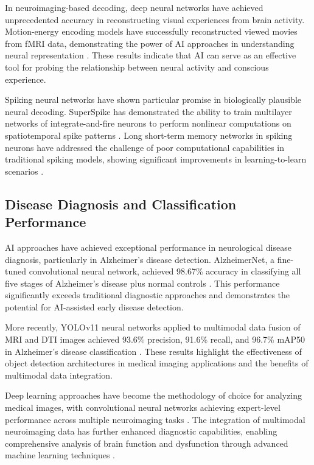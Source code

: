 \documentclass[conference]{IEEEtran}
\begin{document}
In neuroimaging-based decoding, deep neural networks have achieved unprecedented accuracy in reconstructing visual experiences from brain activity. Motion-energy encoding models have successfully reconstructed viewed movies from fMRI data, demonstrating the power of AI approaches in understanding neural representation \citep{mathisDecodingBrainNeural2024}. These results indicate that AI can serve as an effective tool for probing the relationship between neural activity and conscious experience.

Spiking neural networks have shown particular promise in biologically plausible neural decoding. SuperSpike has demonstrated the ability to train multilayer networks of integrate-and-fire neurons to perform nonlinear computations on spatiotemporal spike patterns \citep{zenkeSuperSpikeSupervisedLearning2018}. Long short-term memory networks in spiking neurons have addressed the challenge of poor computational capabilities in traditional spiking models, showing significant improvements in learning-to-learn scenarios \citep{bellecLongShorttermMemory2018}.

\subsection{Disease Diagnosis and Classification Performance}

AI approaches have achieved exceptional performance in neurological disease diagnosis, particularly in Alzheimer's disease detection. AlzheimerNet, a fine-tuned convolutional neural network, achieved 98.67\% accuracy in classifying all five stages of Alzheimer's disease plus normal controls \citep{shamratAlzheimerNetEffectiveDeep2023}. This performance significantly exceeds traditional diagnostic approaches and demonstrates the potential for AI-assisted early disease detection.

More recently, YOLOv11 neural networks applied to multimodal data fusion of MRI and DTI images achieved 93.6\% precision, 91.6\% recall, and 96.7\% mAP50 in Alzheimer's disease classification \citep{hechkelEarlyDetectionClassification2025}. These results highlight the effectiveness of object detection architectures in medical imaging applications and the benefits of multimodal data integration.

Deep learning approaches have become the methodology of choice for analyzing medical images, with convolutional neural networks achieving expert-level performance across multiple neuroimaging tasks \citep{litjensSurveyDeepLearning2017}. The integration of multimodal neuroimaging data has further enhanced diagnostic capabilities, enabling comprehensive analysis of brain function and dysfunction through advanced machine learning techniques \citep{lorenziIntegrationMultimodalData2023}.
\end{document}

